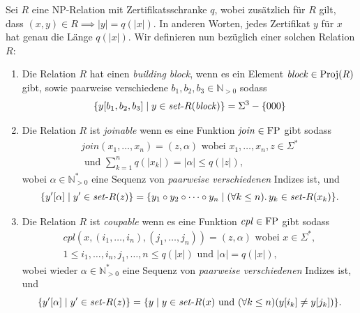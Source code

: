 \begin{definition}
    Sei $R$ eine NP-Relation mit Zertifikatsschranke $q$, wobei zusätzlich für $R$ gilt, dass $(x,y)\in R\implies |y|=q(|x|)$. In anderen Worten, jedes Zertifikat $y$ für $x$ hat genau die Länge $q(|x|)$.
    Wir definieren nun bezüglich einer solchen Relation $R$:
    \begin{enumerate}
        \item Die Relation $R$ hat einen \emph{building block}, wenn es ein Element $\mathit{block}\in\operatorname{Proj}(R)$ gibt, sowie paarweise verschiedene $b_1,b_2,b_3\in\mathbb N_{>0}$ sodass
            \[\{ y[b_1,b_2,b_3] \mid y\in \mathit{set}\text{-}{}R(\mathit{block}) \} = \Sigma^3 - \{000\} \]
        \item Die Relation $R$ ist \emph{joinable} wenn es eine Funktion $\mathit{join}\in \mathrm{FP}$ gibt sodass
            \begin{multline*}  \mathit{join}(x_1, \dots, x_n) = (z, \alpha) \text{ wobei } x_1, \ldots, x_n, z\in \Sigma^* \\\text{ und } \sum_{k=1}^n q(|x_k|)=|\alpha|\leq q(|z|), \end{multline*}
            wobei $\alpha\in \mathbb N_{>0}^*$ eine Sequenz von \emph{paarweise verschiedenen} Indizes ist, und
            \begin{equation*} \{ y'[\alpha] \mid y' \in \mathit{set}\text{-}{}R(z)\} = \{ y_1\circ y_2 \circ \cdots \circ y_n \mid (\forall k\leq n).\, y_k \in \mathit{set}\text{-}{}R(x_k) \}. \end{equation*}
        \item Die Relation $R$ ist \emph{coupable} wenn es eine Funktion $\mathit{cpl}\in \mathrm{FP}$ gibt sodass
            \begin{multline*} \mathit{cpl}(x, (i_1, \ldots, i_n), (j_1, \ldots, j_n)) = (z, \alpha) \text{ wobei } x\in\Sigma^*,\\ 1\leq i_1, \ldots, i_n, j_1,\ldots, n \leq q(|x|) \text{ und } |\alpha|=q(|x|),\end{multline*}
            wobei wieder $\alpha\in \mathbb N_{>0}^*$ eine Sequenz von \emph{paarweise verschiedenen} Indizes ist, und
            \begin{equation*} \{ y'[\alpha] \mid y'\in \mathit{set}\text{-}{}R(z) \} = \{ y \mid y\in \mathit{set}\text{-}{}R(x) \text{ und } (\forall k\leq n)(y[i_k]\neq y[j_k]) \}. \end{equation*}
    \end{enumerate}
\end{definition}


